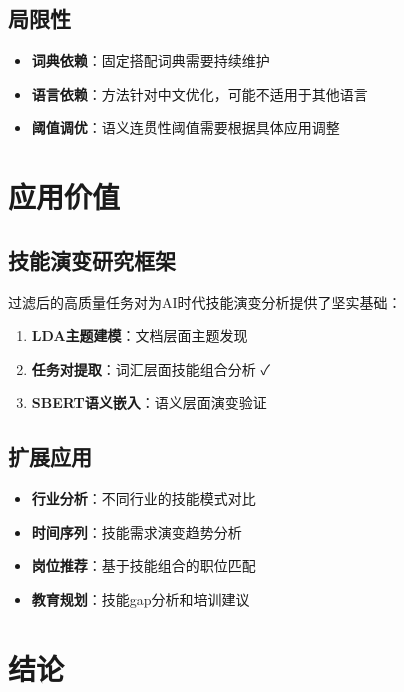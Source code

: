\documentclass[11pt,a4paper]{article}
\begin{document}
\subsection{局限性}

\begin{itemize}
    \item \textbf{词典依赖}：固定搭配词典需要持续维护
    \item \textbf{语言依赖}：方法针对中文优化，可能不适用于其他语言
    \item \textbf{阈值调优}：语义连贯性阈值需要根据具体应用调整
\end{itemize}

\section{应用价值}

\subsection{技能演变研究框架}

过滤后的高质量任务对为AI时代技能演变分析提供了坚实基础：

\begin{enumerate}
    \item \textbf{LDA主题建模}：文档层面主题发现
    \item \textbf{任务对提取}：词汇层面技能组合分析 ✓
    \item \textbf{SBERT语义嵌入}：语义层面演变验证
\end{enumerate}

\subsection{扩展应用}

\begin{itemize}
    \item \textbf{行业分析}：不同行业的技能模式对比
    \item \textbf{时间序列}：技能需求演变趋势分析
    \item \textbf{岗位推荐}：基于技能组合的职位匹配
    \item \textbf{教育规划}：技能gap分析和培训建议
\end{itemize}

\section{结论}
\end{document}
